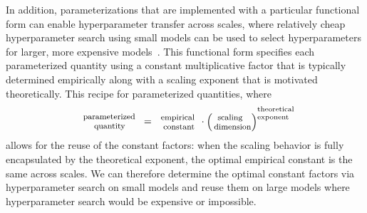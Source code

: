 \documentclass{article}
\theoremstyle{plain}
\theoremstyle{definition}
\theoremstyle{remark}
\newcommand{\hquad}{\hspace{0.5em}}
\begin{document}
In addition, parameterizations that are implemented with a particular functional form can enable hyperparameter transfer across scales, where relatively cheap hyperparameter search using small models can be used to select hyperparameters for larger, more expensive models~\citep{yang2022tensorv}. This functional form specifies each parameterized quantity using a constant multiplicative factor that is typically determined empirically along with a scaling exponent that is motivated theoretically. This recipe for parameterized quantities, where
\begin{align*}
\begin{footnotesize}
    \parbox{55pt}{\centering{parameterized\newline quantity}}\hquad=\hquad \parbox{41pt}{\centering{empirical\newline constant}} \cdot \biggl(\,\parbox{36pt}{\centering{scaling\newline dimension}}\,\biggr)^{\parbox{30pt}{\scriptsize \centering{theoretical\newline exponent}}}
\end{footnotesize}
\end{align*}
allows for the reuse of the constant factors: when the scaling behavior is fully encapsulated by the theoretical exponent, the optimal empirical constant is the same across scales. We can therefore determine the optimal constant factors via hyperparameter search on small models and reuse them on large models where hyperparameter search would be expensive or impossible.
\end{document}
